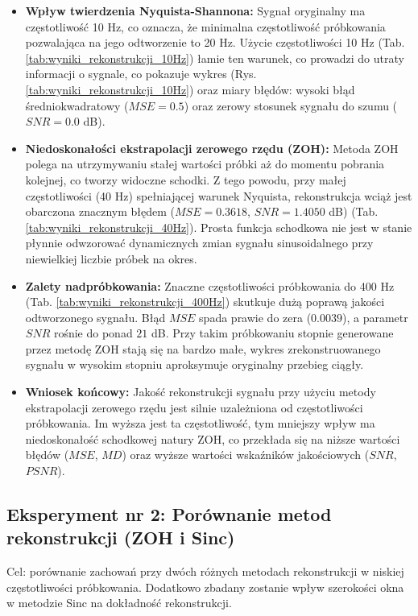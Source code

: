 \documentclass[12pt]{article}
\begin{document}
\begin{itemize}
\item \textbf{Wpływ twierdzenia Nyquista-Shannona:} Sygnał oryginalny ma częstotliwość 10 Hz, co oznacza, że minimalna częstotliwość próbkowania pozwalająca na jego odtworzenie to 20 Hz.
Użycie częstotliwości 10 Hz (Tab. \ref{tab:wyniki_rekonstrukcji_10Hz}) łamie ten warunek, co prowadzi do  utraty informacji o sygnale, co pokazuje wykres (Rys. \ref{tab:wyniki_rekonstrukcji_10Hz}) oraz miary błędów: wysoki błąd średniokwadratowy ($MSE = 0.5$) oraz zerowy stosunek sygnału do szumu ($SNR = 0.0$ dB).

\item \textbf{Niedoskonałości ekstrapolacji zerowego rzędu (ZOH):} Metoda ZOH polega na utrzymywaniu stałej wartości próbki aż do momentu pobrania kolejnej, co tworzy widoczne schodki. Z tego powodu, przy małej częstotliwości (40 Hz) spełniającej warunek Nyquista, rekonstrukcja wciąż jest obarczona znacznym błędem ($MSE = 0.3618$, $SNR = 1.4050$ dB) (Tab. \ref{tab:wyniki_rekonstrukcji_40Hz}). Prosta funkcja schodkowa nie jest w stanie płynnie odwzorować dynamicznych zmian sygnału sinusoidalnego przy niewielkiej liczbie próbek na okres.

\item \textbf{Zalety nadpróbkowania:} Znaczne częstotliwości próbkowania do 400 Hz (Tab. \ref{tab:wyniki_rekonstrukcji_400Hz}) skutkuje dużą poprawą jakości odtworzonego sygnału. Błąd $MSE$ spada prawie do zera ($0.0039$), a parametr $SNR$ rośnie do ponad $21$ dB. Przy takim próbkowaniu stopnie generowane przez metodę ZOH stają się na bardzo małe, wykres zrekonstruowanego sygnału w wysokim stopniu aproksymuje oryginalny przebieg ciągły.

\item \textbf{Wniosek końcowy:} Jakość rekonstrukcji sygnału przy użyciu metody ekstrapolacji zerowego rzędu jest silnie uzależniona od częstotliwości próbkowania. Im wyższa jest ta częstotliwość, tym mniejszy wpływ ma niedoskonałość schodkowej natury ZOH, co przekłada się na niższe wartości błędów ($MSE$, $MD$) oraz wyższe wartości wskaźników jakościowych ($SNR$, $PSNR$).
\end{itemize}


\subsection{Eksperyment nr 2: Porównanie metod rekonstrukcji (ZOH i Sinc)}


Cel: porównanie zachowań przy dwóch różnych metodach rekonstrukcji w niskiej częstotliwości próbkowania. Dodatkowo zbadany zostanie wpływ szerokości okna w metodzie Sinc na dokładność rekonstrukcji.
\end{document}
